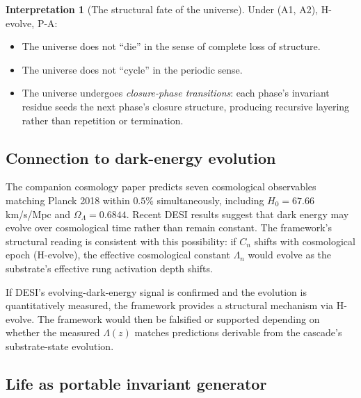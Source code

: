 \documentclass[11pt]{article}
\theoremstyle{plain}
\theoremstyle{definition}
\newtheorem{interpretation}[theorem]{Interpretation}
\theoremstyle{remark}
\begin{document}
\begin{interpretation}[The structural fate of the universe]\label{int:structural-fate}
Under (A1, A2), H-evolve, P-A:
\begin{itemize}[leftmargin=2em]
\item The universe does not ``die'' in the sense of complete loss of structure.
\item The universe does not ``cycle'' in the periodic sense.
\item The universe undergoes \emph{closure-phase transitions}: each phase's invariant residue seeds the next phase's closure structure, producing recursive layering rather than repetition or termination.
\end{itemize}
\end{interpretation}

\subsection{Connection to dark-energy evolution}

The companion cosmology paper \citep{SmartHypersphereCosmology} predicts seven cosmological observables matching Planck 2018 within $0.5\%$ simultaneously, including $H_0 = 67.66$ km/s/Mpc and $\Omega_\Lambda = 0.6844$. Recent DESI results suggest that dark energy may evolve over cosmological time rather than remain constant. The framework's structural reading is consistent with this possibility: if $C_n$ shifts with cosmological epoch (H-evolve), the effective cosmological constant $\Lambda_n$ would evolve as the substrate's effective rung activation depth shifts.

If DESI's evolving-dark-energy signal is confirmed and the evolution is quantitatively measured, the framework provides a structural mechanism via H-evolve. The framework would then be falsified or supported depending on whether the measured $\Lambda(z)$ matches predictions derivable from the cascade's substrate-state evolution.

\subsection{Life as portable invariant generator}
\end{document}
